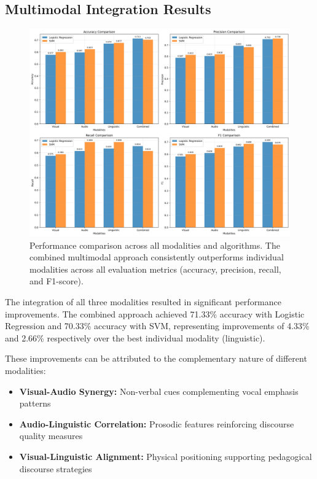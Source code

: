 \subsection{Multimodal Integration Results}

\begin{figure}[H]
    \centering
    \includegraphics[width=\textwidth]{sections/performance_comparison.jpg}
    \caption{Performance comparison across all modalities and algorithms. The combined multimodal approach consistently outperforms individual modalities across all evaluation metrics (accuracy, precision, recall, and F1-score).}
    \label{fig:performance_comparison}
\end{figure}

The integration of all three modalities resulted in significant performance improvements. The combined approach achieved 71.33\% accuracy with Logistic Regression and 70.33\% accuracy with SVM, representing improvements of 4.33\% and 2.66\% respectively over the best individual modality (linguistic).

These improvements can be attributed to the complementary nature of different modalities:
\begin{itemize}
    \item \textbf{Visual-Audio Synergy:} Non-verbal cues complementing vocal emphasis patterns
    \item \textbf{Audio-Linguistic Correlation:} Prosodic features reinforcing discourse quality measures
    \item \textbf{Visual-Linguistic Alignment:} Physical positioning supporting pedagogical discourse strategies
\end{itemize}

